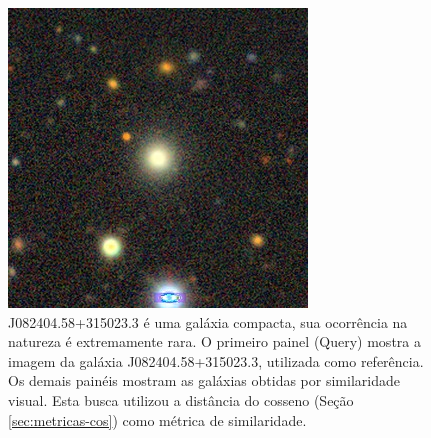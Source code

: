\begin{figure}[!ht]
  \includegraphics[width=0.195\linewidth]{figures/stamps/q3_29}
  \caption{J082404.58+315023.3 é uma galáxia compacta, sua ocorrência na natureza é extremamente rara. O primeiro painel (Query) mostra a imagem da galáxia J082404.58+315023.3, utilizada como referência. Os demais painéis mostram as galáxias obtidas por similaridade visual. Esta busca utilizou a distância do cosseno (Seção \ref{sec:metricas-cos}) como métrica de similaridade.}
  \label{fig:q3}
\end{figure}



